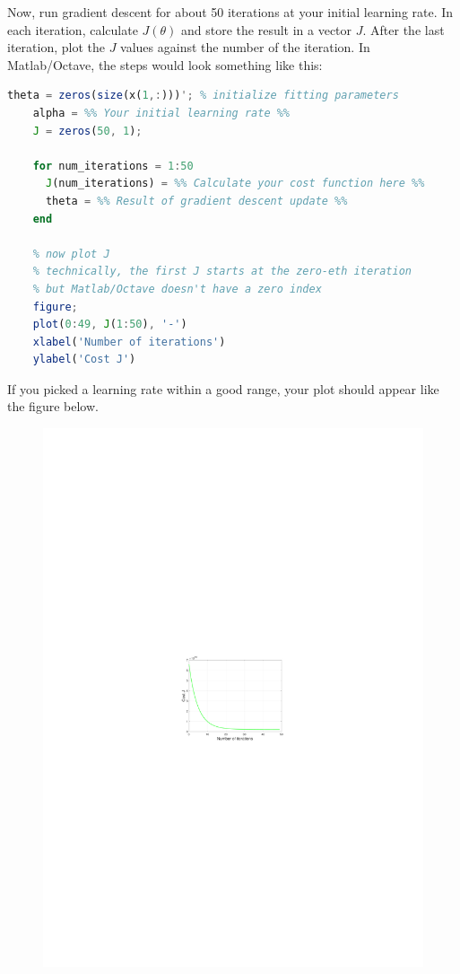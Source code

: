 \documentclass[10pt,a4paper]{article}
\begin{document}
  Now, run gradient descent for about 50 iterations at your initial learning rate. In each iteration, calculate $J(\theta)$ and store the result in a vector $J$. After the last iteration, plot the $J$ values against the number of the iteration. In Matlab/Octave, the steps would look something like this:
  \begin{lstlisting}[language=Octave, basicstyle=\footnotesize, showspaces=false]
    theta = zeros(size(x(1,:)))'; % initialize fitting parameters
    alpha = %% Your initial learning rate %%
    J = zeros(50, 1); 

    for num_iterations = 1:50
      J(num_iterations) = %% Calculate your cost function here %%
      theta = %% Result of gradient descent update %%
    end

    % now plot J
    % technically, the first J starts at the zero-eth iteration
    % but Matlab/Octave doesn't have a zero index
    figure;
    plot(0:49, J(1:50), '-')
    xlabel('Number of iterations')
    ylabel('Cost J')
  \end{lstlisting}
  If you picked a learning rate within a good range, your plot should appear like the figure below.
  \begin{figure}[htb!]
    \centering
      \includegraphics[width=.7\columnwidth]{lrate}
  \end{figure}
\end{document}
